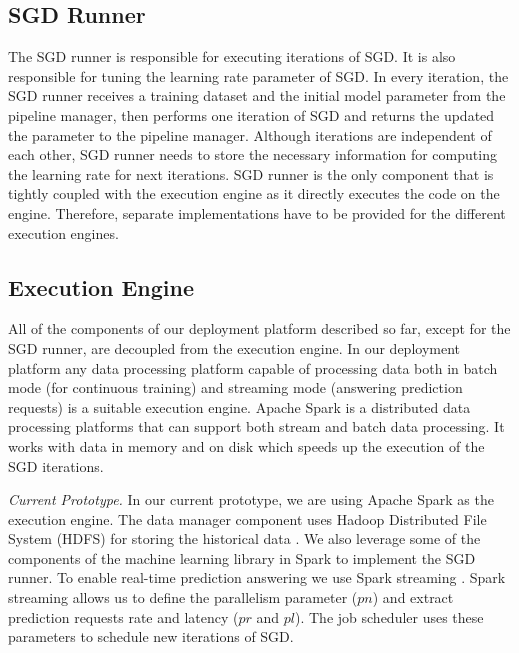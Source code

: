 \subsection{SGD Runner} 
The SGD runner is responsible for executing iterations of SGD.
It is also responsible for tuning the learning rate parameter of SGD.
In every iteration, the SGD runner receives a training dataset and the initial model parameter from the pipeline manager, then performs one iteration of SGD and returns the updated the parameter to the pipeline manager.
Although iterations are independent of each other, SGD runner needs to store the necessary information for computing the learning rate for next iterations.
SGD runner is the only component that is tightly coupled with the execution engine as it directly executes the code on the engine.
Therefore, separate implementations have to be provided for the different execution engines.


\subsection{Execution Engine}
All of the components of our deployment platform described so far, except for the SGD runner, are decoupled from the execution engine.
In our deployment platform any data processing platform capable of processing data both in batch mode (for continuous training) and streaming mode (answering prediction requests) is a suitable execution engine.
Apache Spark \cite{zaharia2010spark} is a distributed data processing platforms that can support both stream and batch data processing.
It works with data in memory and on disk which speeds up the execution of the SGD iterations.

\textit{Current Prototype.}
In our current prototype, we are using Apache Spark \cite{zaharia2010spark} as the execution engine.
The data manager component uses Hadoop Distributed File System (HDFS) for storing the historical data \cite{shvachko2010hadoop}.
We also leverage some of the components of the machine learning library in Spark to implement the SGD runner.
To enable real-time prediction answering we use Spark streaming \cite{zaharia2013discretized}.
Spark streaming allows us to define the parallelism parameter ($pn$) and extract prediction requests rate and latency ($pr$ and $pl$).
The job scheduler uses these parameters to schedule new iterations of SGD.
